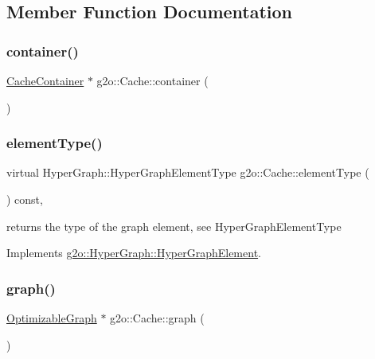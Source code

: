 \subsection{Member Function Documentation}
\mbox{\label{classg2o_1_1_cache_a249ffa5c8ac120b3123bd151200082c9}} 
\subsubsection{\texorpdfstring{container()}{container()}}
{\footnotesize\ttfamily \mbox{\hyperlink{classg2o_1_1_cache_container}{Cache\+Container}} $\ast$ g2o\+::\+Cache\+::container (\begin{DoxyParamCaption}{ }\end{DoxyParamCaption})}

\mbox{\label{classg2o_1_1_cache_ace402a9e59f3fe28ae7e44854cbc5e97}} 
\subsubsection{\texorpdfstring{element\+Type()}{elementType()}}
{\footnotesize\ttfamily virtual Hyper\+Graph\+::\+Hyper\+Graph\+Element\+Type g2o\+::\+Cache\+::element\+Type (\begin{DoxyParamCaption}{ }\end{DoxyParamCaption}) const\hspace{0.3cm}{\ttfamily [inline]}, {\ttfamily [virtual]}}

returns the type of the graph element, see Hyper\+Graph\+Element\+Type 

Implements \mbox{\hyperlink{structg2o_1_1_hyper_graph_1_1_hyper_graph_element_a1a9d7b748698c09d202373e06e413ef2}{g2o\+::\+Hyper\+Graph\+::\+Hyper\+Graph\+Element}}.

\mbox{\label{classg2o_1_1_cache_a1a4480a445469d2d02b8db449e6cb57c}} 
\subsubsection{\texorpdfstring{graph()}{graph()}}
{\footnotesize\ttfamily \mbox{\hyperlink{structg2o_1_1_optimizable_graph}{Optimizable\+Graph}} $\ast$ g2o\+::\+Cache\+::graph (\begin{DoxyParamCaption}{ }\end{DoxyParamCaption})}

